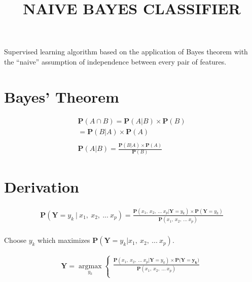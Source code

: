 \documentclass[11pt, a4paper]{article}
\begin{document}
\title{NAIVE BAYES CLASSIFIER}
\date{}
\maketitle

Supervised learning algorithm based on the application of Bayes\textsc{} theorem with the 
``naive'' assumption of independence between every pair of features.

\section{Bayes' Theorem}

\begin{align*}
	\mathbf{P}(A\cap B) = \mathbf{P}(A|B) \times \mathbf{P}(B)                   \\
	= \mathbf{P}(B|A) \times \mathbf{P}(A)                                       \\
	                                                                             \\
	\mathbf{P}(A|B) = \frac{\mathbf{P}(B|A) \times \mathbf{P}(A)}{\mathbf{P}(B)} 
\end{align*}

\section{Derivation}

\begin{align*}
	\mathbf{P}(\mathbf{Y}=y_k\ |\ x_1,\ x_2,\ ...\ x_p) = \frac{\mathbf{P}(x_1,\ x_2,\ ...\ x_p|\mathbf{Y}=y_k) \times \mathbf{P}(\mathbf{Y}=y_k)}{\mathbf{P}(x_1,\ x_2,\ ...\ x_p)} \\
\end{align*}

Choose $y_k$ which maximizes $\mathbf{P}(\mathbf{Y}=y_k | x_1,\ x_2,\ ...\ x_p)$. 

\begin{align*}
	\mathbf{Y} = \operatorname*{argmax}_{y_k}\left\{                                                                             
	\begin{array}{ll}                                                                                                            
	\frac{\mathbf{P}(x_1,\ x_2,\ ...\ x_p | \mathbf{Y}=y_k) \times \mathbf{P}(\mathbf{Y=y_k)}}{\mathbf{P}(x_1,\ x_2,\ ...\ x_p)} \\
	\end{array}                                                                                                                  
	\right.                                                                                                                      \\
\end{align*}
\end{document}
